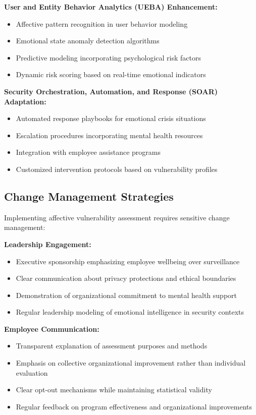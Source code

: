 \documentclass[11pt,a4paper]{article}
\begin{document}
\textbf{User and Entity Behavior Analytics (UEBA) Enhancement:}
\begin{itemize}
\item Affective pattern recognition in user behavior modeling
\item Emotional state anomaly detection algorithms
\item Predictive modeling incorporating psychological risk factors
\item Dynamic risk scoring based on real-time emotional indicators
\end{itemize}

\textbf{Security Orchestration, Automation, and Response (SOAR) Adaptation:}
\begin{itemize}
\item Automated response playbooks for emotional crisis situations
\item Escalation procedures incorporating mental health resources
\item Integration with employee assistance programs
\item Customized intervention protocols based on vulnerability profiles
\end{itemize}

\subsection{Change Management Strategies}

Implementing affective vulnerability assessment requires sensitive change management:

\textbf{Leadership Engagement:}
\begin{itemize}
\item Executive sponsorship emphasizing employee wellbeing over surveillance
\item Clear communication about privacy protections and ethical boundaries
\item Demonstration of organizational commitment to mental health support
\item Regular leadership modeling of emotional intelligence in security contexts
\end{itemize}

\textbf{Employee Communication:}
\begin{itemize}
\item Transparent explanation of assessment purposes and methods
\item Emphasis on collective organizational improvement rather than individual evaluation
\item Clear opt-out mechanisms while maintaining statistical validity
\item Regular feedback on program effectiveness and organizational improvements
\end{itemize}
\end{document}
